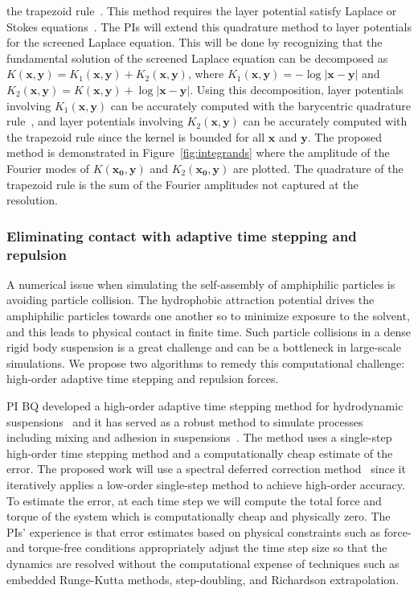 the trapezoid rule~\cite{ioa-pap-per1991}. This method requires the
layer potential satisfy Laplace or Stokes
equations~\cite{bar-wu-vee2015, chi-moo-qua2020}. The PIs will extend
this quadrature method to layer potentials for the screened Laplace
equation. This will be done by recognizing that the fundamental solution
of the screened Laplace equation can be decomposed as
$K(\mathbf{x},\mathbf{y}) = K_1(\mathbf{x},\mathbf{y}) +
K_2(\mathbf{x},\mathbf{y})$, where $K_1(\mathbf{x},\mathbf{y}) =
-\log|\mathbf{x} - \mathbf{y}|$ and $K_2(\mathbf{x},\mathbf{y}) =
K(\mathbf{x},\mathbf{y}) + \log|\mathbf{x} - \mathbf{y}|$. Using this
decomposition, layer potentials involving $K_1(\mathbf{x},\mathbf{y})$
can be accurately computed with the barycentric quadrature
rule~\cite{ioa-pap-per1991}, and layer potentials involving
$K_2(\mathbf{x},\mathbf{y})$ can be accurately computed with the
trapezoid rule since the kernel is bounded for all $\mathbf{x}$ and
$\mathbf{y}$. The proposed method is demonstrated in
Figure~\ref{fig:integrands} where the amplitude of the Fourier modes of
$K(\mathbf{x_0},\mathbf{y})$ and $K_2(\mathbf{x_0},\mathbf{y})$ are
plotted. The quadrature of the trapezoid rule is the sum of the Fourier
amplitudes not captured at the resolution.


\subsubsection{Eliminating contact with adaptive time stepping and
repulsion}
\label{subsec:timeStepping}

A numerical issue when simulating the self-assembly of amphiphilic
particles is avoiding particle collision. The hydrophobic attraction
potential drives the amphiphilic particles towards one another so to
minimize exposure to the solvent, and this leads to physical contact in
finite time. Such particle collisions in a dense rigid body suspension
is a great challenge and can be a bottleneck in large-scale simulations.
We propose two algorithms to remedy this computational challenge:
high-order adaptive time stepping and repulsion forces.

PI BQ developed a high-order adaptive time stepping method for
hydrodynamic suspensions~\cite{qua-bir2016} and it has served as a
robust method to simulate processes including mixing and adhesion in
suspensions~\cite{qua-vee-you2019, kab-qua-bir2017}. The method uses
a single-step high-order time stepping method and a computationally
cheap estimate of the error. The proposed work will use a spectral
deferred correction method~\cite{dut-gre-rok2000} since it iteratively
applies a low-order single-step method to achieve high-order accuracy.
To estimate the error, at each time step we will compute the total force
and torque of the system which is computationally cheap and physically
zero. The PIs' experience is that error estimates based on physical
constraints such as force- and torque-free conditions appropriately
adjust the time step size so that the dynamics are resolved without the
computational expense of techniques such as embedded Runge-Kutta
methods, step-doubling, and Richardson extrapolation.

